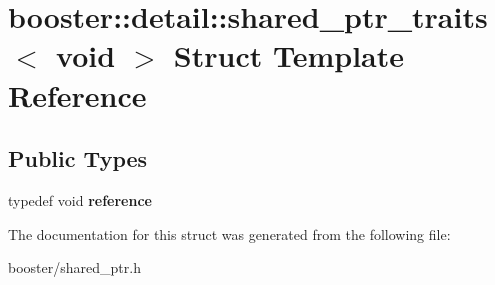 \section{booster\+:\+:detail\+:\+:shared\+\_\+ptr\+\_\+traits$<$ void $>$ Struct Template Reference}
\label{structbooster_1_1detail_1_1shared__ptr__traits_3_01void_01_4}
\subsection*{Public Types}
\begin{DoxyCompactItemize}
\item 
typedef void {\bfseries reference}\label{structbooster_1_1detail_1_1shared__ptr__traits_3_01void_01_4_a963de5367a05086b331662727a190fd1}

\end{DoxyCompactItemize}


The documentation for this struct was generated from the following file\+:\begin{DoxyCompactItemize}
\item 
booster/shared\+\_\+ptr.\+h\end{DoxyCompactItemize}
